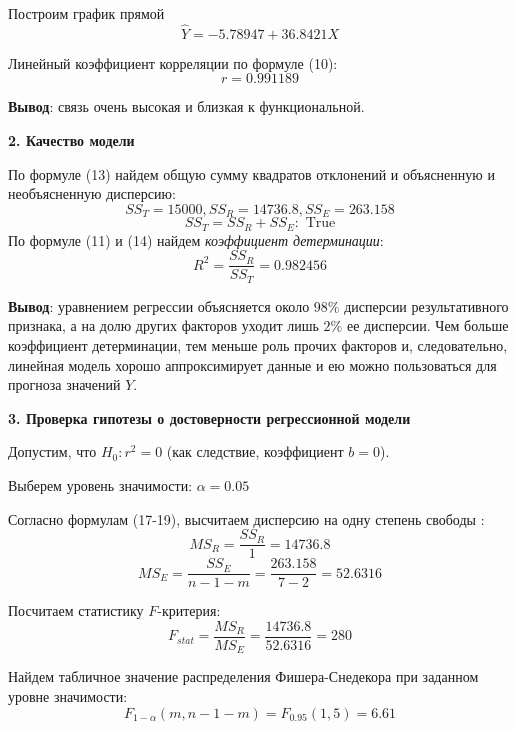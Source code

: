 \documentclass[aps,%
12pt,%
final,%
oneside,
onecolumn,%
musixtex, %
superscriptaddress,%
centertags]{article} %
\begin{document}
Построим график прямой $$\widehat{Y} = -5.78947 + 36.8421X$$
\begin{center}
\end{center}

Линейный коэффициент корреляции по формуле (10):
$$ r = 0.991189$$

\textbf{Вывод}: связь очень высокая и близкая к функциональной.

\begin{center}
\textbf{2. Качество модели} 
\end{center}

По формуле (13) найдем общую сумму квадратов отклонений и объясненную и необъясненную дисперсию:
$$ SS_T = 15000 , SS_R = 14736.8, SS_E = 263.158$$
$$ SS_T = SS_R + SS_E:  \text{ True}$$ 
По формуле (11) и (14) найдем \textit{коэффициент детерминации}:
$$ R^2 = \frac{SS_R}{SS_T} = 0.982456$$ 

\textbf{Вывод}: уравнением регрессии объясняется около $98\%$ дисперсии результативного признака, а на долю других факторов уходит лишь $2\%$ ее дисперсии. Чем больше коэффициент детерминации, тем меньше роль прочих факторов и, следовательно, линейная модель хорошо аппроксимирует данные и ею можно пользоваться для прогноза значений $Y$.

\begin{center}
\textbf{3. Проверка гипотезы о достоверности регрессионной модели} 
\end{center}

Допустим, что $H_0: r^2 = 0$ (как следствие, коэффициент $b=0$).

Выберем уровень значимости: $\alpha = 0.05$

Согласно формулам (17-19), высчитаем дисперсию на одну степень свободы :
$$ MS_R = \frac{SS_R}{1} = 14736.8 $$
$$ MS_E = \frac{SS_E}{n-1-m} = \frac{263.158}{7-2} = 52.6316 $$

Посчитаем статистику $F$-критерия: $$ F_{stat} = \frac{MS_R}{MS_E} = \frac{14736.8}{52.6316} = 280$$

Найдем табличное значение распределения Фишера-Снедекора при заданном уровне значимости:
$$ F_{1-\alpha}(m,n-1-m) = F_{0.95}(1,5) = 6.61$$
\end{document}

